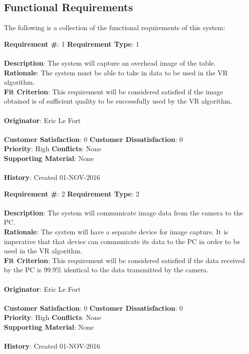 \documentclass[titlepage]{article}
\begin{document}
\subsection{Functional Requirements}
The following is a collection of the functional requirements of this system:
\begin{framed}
	\noindent\textbf{Requirement \#}: 1 \hfill \textbf{Requirement Type}: 1 \hfill\\\\
	\noindent\textbf{Description}: The system will capture an overhead image of the table.\\
	\textbf{Rationale}: The system must be able to take in data to be used in the VR algorithm.\\
	\textbf{Fit Criterion}: This requirement will be considered satisfied if the image obtained is of sufficient quality to be successfully used by the VR algorithm.\\\\
	\textbf{Originator}: Eric Le Fort\\\\
	\noindent\textbf{Customer Satisfaction}: 0 \hfill 	\textbf{Customer Dissatisfaction}: 0 \hfill\\
	\textbf{Priority}: High \hfill \textbf{Conflicts}: None \hfill 		\\
	\textbf{Supporting Material}: None\\\\
	\noindent\textbf{History}: Created 01-NOV-2016
\end{framed}

\newpage
\begin{framed}
	\noindent\textbf{Requirement \#}: 2 \hfill \textbf{Requirement Type}: 2 \hfill\\\\
	\noindent\textbf{Description}: The system will communicate image data from the camera to the PC.\\
	\textbf{Rationale}: The system will have a separate device for image capture. It is imperative that that device can communicate its data to the PC in order to be used in the VR algorithm.\\
	\textbf{Fit Criterion}: This requirement will be considered satisfied if the data received by the PC is 99.9\% identical to the data transmitted by the camera.\\\\
	\textbf{Originator}: Eric Le Fort\\\\
	\noindent\textbf{Customer Satisfaction}: 0 \hfill 	\textbf{Customer Dissatisfaction}: 0 \hfill\\
	\textbf{Priority}: High \hfill \textbf{Conflicts}: None \hfill\\
	\textbf{Supporting Material}: None\\\\
	\noindent\textbf{History}: Created 01-NOV-2016
\end{framed}
\end{document}
